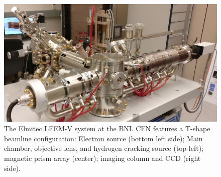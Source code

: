 \begin{figure}
    \centering
    \includegraphics[scale=0.13]{./figs/LEEM-V1.jpg}
    \caption{
    The Elmitec LEEM-V system at the BNL CFN features a T-shape beamline configuration: Electron source (bottom left side); Main chamber, objective lens, and hydrogen cracking source (top left); magnetic prism array (center); imaging column and CCD (right side).
    }
    \label{fig:LEEM-V}
\end{figure}


